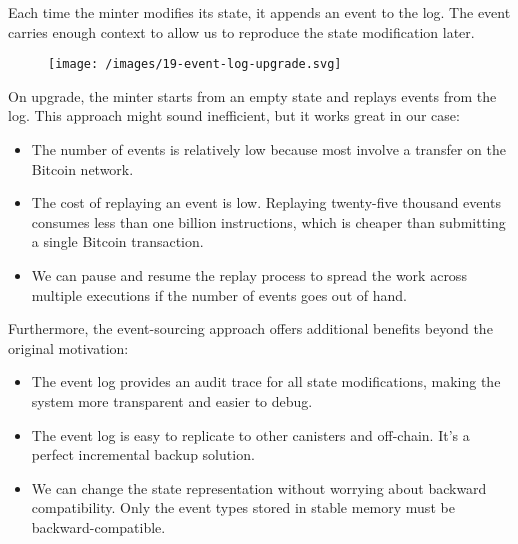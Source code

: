 \documentclass{article}
\begin{document}
Each time the minter modifies its state, it appends an event to the log.
The event carries enough context to allow us to reproduce the state modification later.

\begin{figure}[grayscale-diagram]
  \texttt{[image: /images/19-event-log-upgrade.svg]}
\end{figure}

On upgrade, the minter starts from an empty state and replays events from the log.
This approach might sound inefficient, but it works great in our case:

\begin{itemize}
    \item
    The number of events is relatively low because most involve a transfer on the Bitcoin network.
    \item
    The cost of replaying an event is low.
    Replaying twenty-five thousand events consumes less than one billion instructions, which is cheaper than submitting a single Bitcoin transaction.
    \item
    We can pause and resume the replay process to spread the work across multiple executions if the number of events goes out of hand.
\end{itemize}

Furthermore, the event-sourcing approach offers additional benefits beyond the original motivation:

\begin{itemize}
    \item
    The event log provides an audit trace for all state modifications, making the system more transparent and easier to debug.
    \item
    The event log is easy to replicate to other canisters and off-chain.
    It's a perfect incremental backup solution.
    \item
    We can change the state representation without worrying about backward compatibility.
    Only the event types stored in stable memory must be backward-compatible.
\end{itemize}
\end{document}
